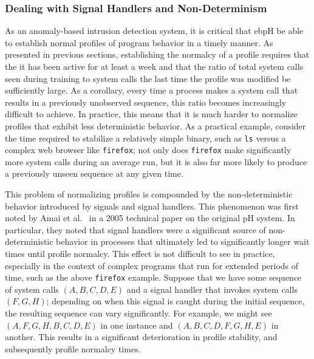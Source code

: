 \documentclass[
  12pt]{findlay}
\newcommand{\passthrough}[1]{#1}
\begin{document}
\hypertarget{dealing-with-signal-handlers-and-non-determinism}{%
\subsubsection{Dealing with Signal Handlers and
Non-Determinism}\label{dealing-with-signal-handlers-and-non-determinism}}

As an anomaly-based intrusion detection system, it is critical that ebpH
be able to establish normal profiles of program behavior in a timely
manner. As presented in previous sections, establishing the normalcy of
a profile requires that the it has been active for at least a week and
that the ratio of total system calls seen during training to system
calls the last time the profile was modified be sufficiently large. As a
corollary, every time a process makes a system call that results in a
previously unobserved sequence, this ratio becomes increasingly
difficult to achieve. In practice, this means that it is much harder to
normalize profiles that exhibit less deterministic behavior. As a
practical example, consider the time required to stabilize a relatively
simple binary, such as \passthrough{\lstinline!ls!} versus a complex web
browser like \passthrough{\lstinline!firefox!}; not only does
\passthrough{\lstinline!firefox!} make significantly more system calls
during an average run, but it is also far more likely to produce a
previously unseen sequence at any given time.

This problem of normalizing profiles is compounded by the
non-deterministic behavior introduced by signals and signal handlers.
This phenomenon was first noted by Amai et al.~\autocite{amai05} in a
2005 technical paper on the original pH system. In particular, they
noted that signal handlers were a significant source of
non-deterministic behavior in processes that ultimately led to
significantly longer wait times until profile normalcy. This effect is
not difficult to see in practice, especially in the context of complex
programs that run for extended periods of time, such as the above
\passthrough{\lstinline!firefox!} example. Suppose that we have some
sequence of system calls \((A, B, C, D, E)\) and a signal handler that
invokes system calls \((F, G, H)\); depending on when this signal is
caught during the initial sequence, the resulting sequence can vary
significantly. For example, we might see \((A, F, G, H, B, C, D, E)\) in
one instance and \((A, B, C, D, F, G, H, E)\) in another. This results
in a significant deterioration in profile stability, and subsequently
profile normalcy times.
\end{document}
